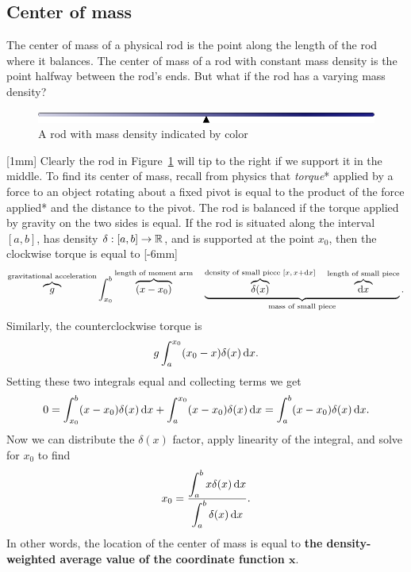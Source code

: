 \documentclass{watsonbook}
\begin{document}
\subsection{Center of mass}

The center of mass of a physical rod is the point along the length of
the rod where it balances. The center of mass of a rod with constant
mass density is the point halfway between the rod's ends. But what if
the rod has a varying mass density?

\begin{figure}[h!]
  \centering
  \includegraphics[width=12cm]{figures/centerofmass}
  \caption{A rod with mass density indicated by color}
  \label{fig:rod} 
\end{figure}

[1mm] Clearly the rod in Figure~\ref{fig:rod} will tip to
the right if we support it in the middle. To find its center of mass,
recall from physics that \textit{torque}* applied by a force to an
object rotating about a fixed pivot is equal to the product of the
force applied* and the distance to the pivot. The rod is balanced if
the torque applied by gravity on the two sides is equal. If the rod is
situated along the interval $[a,b]$, has density
$\delta:[a,b] \to \mathbb{R}$, and is supported at the point $x_0$, then the
clockwise torque is equal to [-6mm]
\[
  \overbrace{g}^{\text{gravitational acceleration}}\int_{x_0}^b
  \overbrace{(x-x_0)}^{\text{length of moment arm}} \quad
  \underbrace{\overbrace{\delta(x)}^{\text{density of small piece
      }[x,\, x+\mathrm{d} x]} \quad \overbrace{\mathrm{d} x}^{\text{length of small
        piece}}}_{\text{mass of small piece}}.
\]
Similarly, the counterclockwise torque is 
\[
  g\int_{a}^{x_0} (x_0-x)\delta(x) \, \mathrm{d} x. 
\]
Setting these two integrals equal and collecting terms we get 
\[
  0 = \int_{x_0}^{b} (x-x_0)\delta(x) \, \mathrm{d} x + \int_{a}^{x_0} (x-x_0)\delta(x) \, \mathrm{d} x =
  \int_{a}^{b} (x-x_0)\delta(x) \, \mathrm{d} x. 
\]
Now we can distribute the $\delta(x)$ factor, apply linearity of the
integral, and solve for $x_0$ to find
\[
  x_0 = \frac{\displaystyle{\int_a^b x \delta(x) \, \mathrm{d}x}}{\displaystyle{\int_a^b \delta(x) \, \mathrm{d}x}}. 
\]
In other words, the location of the center of mass is equal to
\textbf{the density-weighted average value of the coordinate function
  $\bm{x}$}.
\end{document}
